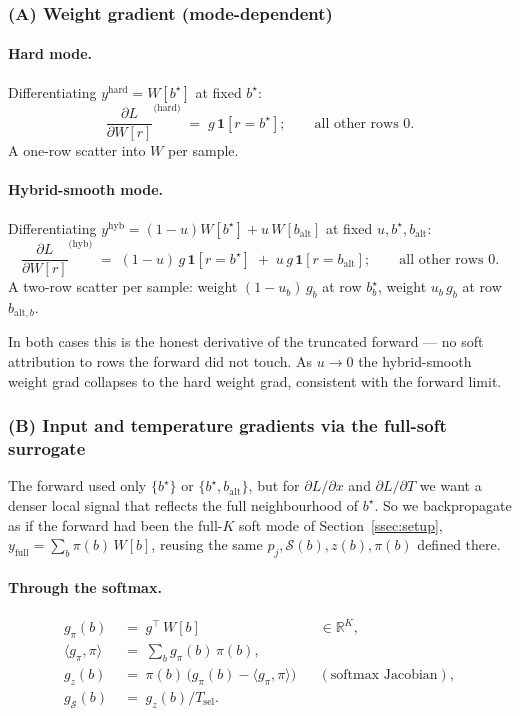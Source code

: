 \documentclass[11pt]{article}
\newcommand{\R}{\mathbb{R}}
\newcommand{\Tsel}{T_{\mathrm{sel}}}
\newcommand{\bstar}{b^{\star}}
\begin{document}
\subsubsection*{(A) Weight gradient (mode-dependent)}

\paragraph{Hard mode.} Differentiating $y^{\text{hard}} = W[\bstar]$ at fixed $\bstar$:
\[
\frac{\partial L}{\partial W[r]}^{\text{(hard)}} \;=\; g\,\mathbf{1}[r = \bstar];
\qquad \text{all other rows } 0.
\]
A one-row scatter into $W$ per sample.

\paragraph{Hybrid-smooth mode.} Differentiating $y^{\text{hyb}} = (1-u) W[\bstar] + u\, W[b_{\text{alt}}]$ at fixed $u, \bstar, b_{\text{alt}}$:
\[
\frac{\partial L}{\partial W[r]}^{\text{(hyb)}} \;=\; (1-u)\,g\,\mathbf{1}[r = \bstar] \;+\; u\,g\,\mathbf{1}[r = b_{\text{alt}}];
\qquad \text{all other rows } 0.
\]
A two-row scatter per sample: weight $(1-u_b)\,g_b$ at row $\bstar_b$, weight $u_b\,g_b$ at row $b_{\text{alt},b}$.

In both cases this is the honest derivative of the truncated forward --- no soft attribution to rows the forward did not touch. As $u \to 0$ the hybrid-smooth weight grad collapses to the hard weight grad, consistent with the forward limit.

\subsubsection*{(B) Input and temperature gradients via the full-soft surrogate}

The forward used only $\{\bstar\}$ or $\{\bstar, b_{\text{alt}}\}$, but for $\partial L/\partial x$ and $\partial L / \partial T$ we want a denser local signal that reflects the full neighbourhood of $\bstar$. So we backpropagate as if the forward had been the full-$K$ soft mode of Section~\ref{ssec:setup}, $y_{\text{full}} = \sum_b \pi(b)\, W[b]$, reusing the same $p_j, \mathcal S(b), z(b), \pi(b)$ defined there.

\paragraph{Through the softmax.}
\begin{align*}
g_{\pi}(b) &\;=\; g^{\top}\,W[b]                                                 && \in\R^K, \\
\langle g_\pi, \pi\rangle &\;=\; \sum_b g_\pi(b)\,\pi(b),                                       \\
g_{z}(b)  &\;=\; \pi(b)\,\bigl(g_{\pi}(b) - \langle g_\pi, \pi\rangle\bigr) && (\text{softmax Jacobian}), \\
g_{\mathcal S}(b) &\;=\; g_z(b)/\Tsel.
\end{align*}
\end{document}
